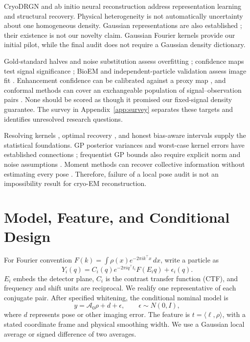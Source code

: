 \documentclass{article}
\newcommand{\ip}[2]{\langle #1,#2\rangle}
\newcommand{\A}{\mathcal A}
\begin{document}
CryoDRGN \citep{zhong2021} and ab initio neural reconstruction \citep{drgnai2025} address representation learning and structural recovery. Physical heterogeneity is not automatically uncertainty about one homogeneous density. Gaussian representations are also established \citep{chen2021,chen2025,qu2025,shekar2025,gaussianem2026}; their existence is not our novelty claim. Gaussian Fourier kernels provide our initial pilot, while the final audit does not require a Gaussian density dictionary.

Gold-standard halves and noise substitution assess overfitting \citep{schereschen2012,chen2013}; confidence maps test signal significance \citep{beckers2019,beckers2020}; BioEM and independent-particle validation assess image fit \citep{bioem2013,independent2020}. Enhancement confidence can be calibrated against a proxy map \citep{locscale2026}, and conformal methods can cover an exchangeable population of signal--observation pairs \citep{narnhofer2024}. None should be scored as though it promised our fixed-signal density guarantee. The survey in Appendix~\ref{app:survey} separates these targets and identifies unresolved research questions.

Resolving kernels \citep{backusgilbert1968}, optimal recovery \citep{donoho1994}, and honest bias-aware intervals \citep{armstrong2018} supply the statistical foundations. GP posterior variances and worst-case kernel errors have established connections \citep{kanagawa2025}; frequentist GP bounds also require explicit norm and noise assumptions \citep{fiedler2021}. Moment methods can recover collective information without estimating every pose \citep{sharon2020,subspacemom2026}. Therefore, failure of a local pose audit is not an impossibility result for cryo-EM reconstruction.

\section{Model, Feature, and Conditional Design}
For Fourier convention $F(k)=\int\rho(x)e^{-2\pi i k^\top x}\,dx$, write a particle as
\begin{equation}
Y_i(q)=C_i(q)e^{-2\pi i q^\top t_i}F(E_iq)+\epsilon_i(q).
\end{equation}
$E_i$ embeds the detector plane, $C_i$ is the contrast transfer function (CTF), and frequency and shift units are reciprocal. We realify one representative of each conjugate pair. After specified whitening, the conditional nominal model is
\begin{equation}\label{eq:conditionalmodel}
y=\A_0\rho+d+\epsilon,\qquad \epsilon\sim N(0,I),
\end{equation}
where $d$ represents pose or other imaging error. The feature is $t=\ip{\ell}{\rho}$, with a stated coordinate frame and physical smoothing width. We use a Gaussian local average or signed difference of two averages.
\end{document}
